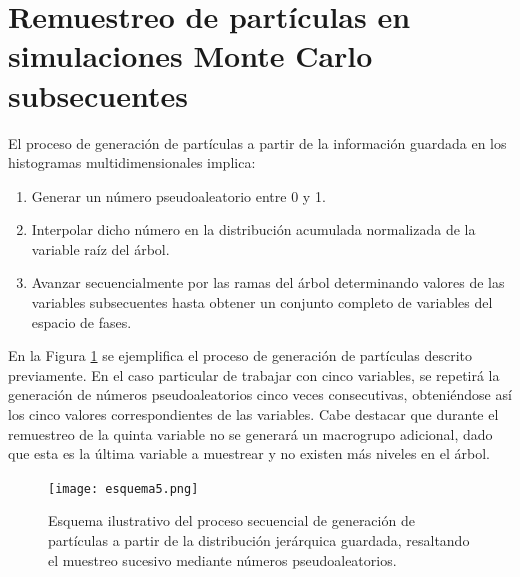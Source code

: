 


\section{Remuestreo de partículas en simulaciones Monte Carlo subsecuentes}
El proceso de generación de partículas a partir de la información guardada en los histogramas multidimensionales implica:
\begin{enumerate}
    \item Generar un número pseudoaleatorio entre 0 y 1.
    \item Interpolar dicho número en la distribución acumulada normalizada de la variable raíz del árbol.
    \item Avanzar secuencialmente por las ramas del árbol determinando valores de las variables subsecuentes hasta obtener un conjunto completo de variables del espacio de fases.
\end{enumerate}

En la Figura \ref{fig:esquema_generacion_particulas} se ejemplifica el proceso de generación de partículas descrito previamente. En el caso particular de trabajar con cinco variables, se repetirá la generación de números pseudoaleatorios cinco veces consecutivas, obteniéndose así los cinco valores correspondientes de las variables. Cabe destacar que durante el remuestreo de la quinta variable no se generará un macrogrupo adicional, dado que esta es la última variable a muestrear y no existen más niveles en el árbol.

\begin{figure}[H]
    \centering
    \texttt{[image: esquema5.png]}
    \caption{Esquema ilustrativo del proceso secuencial de generación de partículas a partir de la distribución jerárquica guardada, resaltando el muestreo sucesivo mediante números pseudoaleatorios.}
    \label{fig:esquema_generacion_particulas}
\end{figure}

